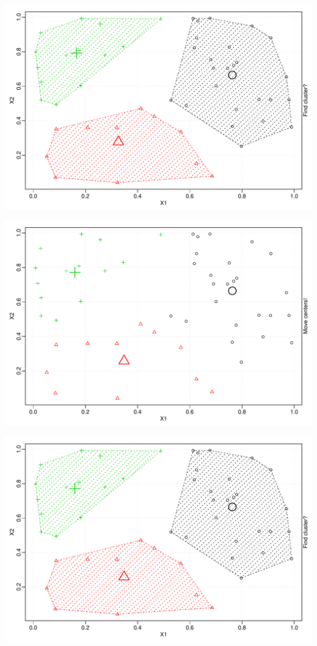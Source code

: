 \documentclass{beamer}\usepackage[]{graphicx}\usepackage[]{color}
\newenvironment{knitrout}{}{} %
\begin{document}
\begin{frame}
\begin{knitrout}
\includegraphics[width=.8\textwidth]{figures/unnamed-chunk-1-16} 

\includegraphics[width=.8\textwidth]{figures/unnamed-chunk-1-17} 

\includegraphics[width=.8\textwidth]{figures/unnamed-chunk-1-18} 

\end{knitrout}

\end{frame}
\end{document}
